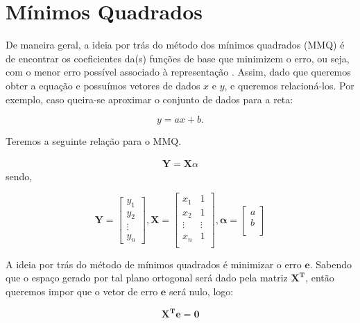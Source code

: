 \section{Mínimos Quadrados}
\label{sec:MMQ}
De maneira geral, a ideia por trás do método dos mínimos quadrados (MMQ) é de encontrar os coeficientes da(s) funções de base que minimizem o erro, ou seja, com o menor erro possível associado à representação \cite{MMQ}. Assim, dado que queremos obter a equação e possuímos vetores de dados $x$ e $y$, e queremos relacioná-los. Por exemplo, caso queira-se aproximar o conjunto de dados para a reta:

\begin{equation}
    y = ax + b.
    \label{eq:pol1}
\end{equation}

Teremos a seguinte relação para o MMQ.

\begin{align*}
    \textbf{Y} = \textbf{X}\alpha
\end{align*}
sendo,

\begin{equation*}
    \textbf{Y} =
    \begin{bmatrix}
     y_1\\
     y_2\\
     \vdots\\
     y_n
    \end{bmatrix},
    \textbf{X} = 
    \begin{bmatrix}
        x_1 & 1\\
        x_2 & 1\\
        \vdots & \vdots\\
        x_n & 1\\
    \end{bmatrix},
    \bm{\alpha} =
    \begin{bmatrix}
        a\\
        b\\
    \end{bmatrix}
\end{equation*}

A ideia por trás do método de mínimos quadrados é minimizar o erro $\bm{e}$. Sabendo que o espaço gerado por tal plano ortogonal será dado pela matriz $\bm{X^T}$, então queremos impor que o vetor de erro $\bm{e}$ será nulo, logo:


\[\bm{X^T e = 0}\]

